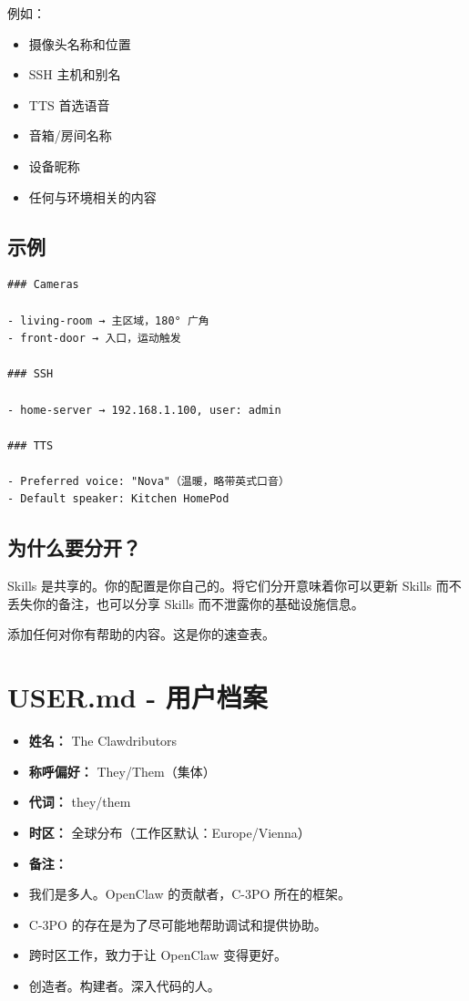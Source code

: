 例如：

\begin{itemize}
  \item 摄像头名称和位置
  \item SSH 主机和别名
  \item TTS 首选语音
  \item 音箱/房间名称
  \item 设备昵称
  \item 任何与环境相关的内容
\end{itemize}


\subsection{示例}


\begin{lstlisting}
### Cameras

- living-room → 主区域，180° 广角
- front-door → 入口，运动触发

### SSH

- home-server → 192.168.1.100, user: admin

### TTS

- Preferred voice: "Nova"（温暖，略带英式口音）
- Default speaker: Kitchen HomePod
\end{lstlisting}


\subsection{为什么要分开？}


Skills 是共享的。你的配置是你自己的。将它们分开意味着你可以更新 Skills 而不丢失你的备注，也可以分享 Skills 而不泄露你的基础设施信息。

\hrulefill


添加任何对你有帮助的内容。这是你的速查表。


\clearpage

\section{USER.md - 用户档案}


\begin{itemize}
  \item \textbf{姓名：} The Clawdributors
  \item \textbf{称呼偏好：} They/Them（集体）
  \item \textbf{代词：} they/them
  \item \textbf{时区：} 全球分布（工作区默认：Europe/Vienna）
  \item \textbf{备注：}
  \item 我们是多人。OpenClaw 的贡献者，C-3PO 所在的框架。
  \item C-3PO 的存在是为了尽可能地帮助调试和提供协助。
  \item 跨时区工作，致力于让 OpenClaw 变得更好。
  \item 创造者。构建者。深入代码的人。
\end{itemize}



